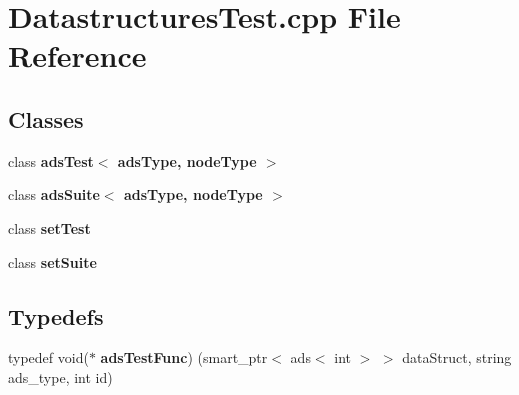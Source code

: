 \section{Datastructures\+Test.\+cpp File Reference}
\label{DatastructuresTest_8cpp}
\subsection*{Classes}
\begin{DoxyCompactItemize}
\item 
class {\bf ads\+Test$<$ ads\+Type, node\+Type $>$}
\item 
class {\bf ads\+Suite$<$ ads\+Type, node\+Type $>$}
\item 
class {\bf set\+Test}
\item 
class {\bf set\+Suite}
\end{DoxyCompactItemize}
\subsection*{Typedefs}
\begin{DoxyCompactItemize}
\item 
typedef void($\ast$ {\bf ads\+Test\+Func}) (smart\+\_\+ptr$<$ ads$<$ int $>$ $>$ data\+Struct, string ads\+\_\+type, int id)
\end{DoxyCompactItemize}
